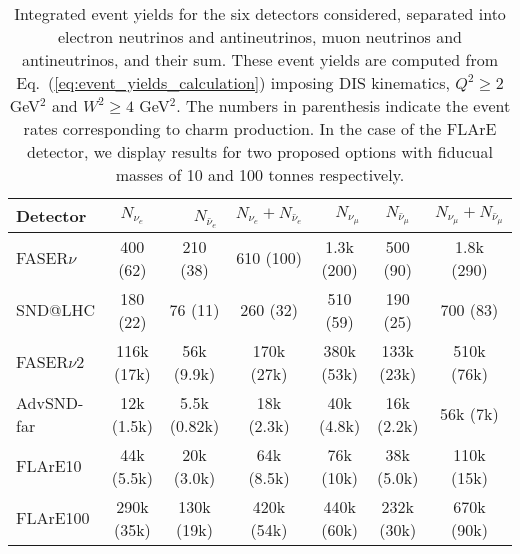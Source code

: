 \begin{table}[t]
  \centering
  \small
  \renewcommand{\arraystretch}{1.70}
\begin{tabularx}{\textwidth}{X||c|c|c||c|c|c}
\toprule
Detector & $\quad$ $N_{\nu_e}$ $\quad$ &$\quad$ $N_{\bar{\nu}_e}$$\quad$   &   $N_{\nu_e} + N_{\bar{\nu}_e}$ &
$\quad$$N_{\nu_\mu}$ $\quad$ & $\quad$ $N_{\bar{\nu}_\mu}$ $\quad$  &   $N_{\nu_\mu} + N_{\bar{\nu}_\mu}$ \\
\midrule
\midrule
FASER$\nu$  & 400 (62)    & 210 (38)  & 610 (100)  &  1.3k (200)  &  500 (90)  &  1.8k (290) \\
SND@LHC  &  180 (22)  & 76 (11)    & 260 (32)   &  510 (59) & 190 (25)   &  700  (83)\\
\midrule
\midrule
FASER$\nu$2  & 116k (17k)   & 56k (9.9k)   & 170k (27k)  & 380k (53k)  & 133k (23k)    & 510k (76k)   \\
AdvSND-far  &  12k (1.5k)  & 5.5k (0.82k)   & 18k (2.3k)  & 40k (4.8k)  & 16k (2.2k)   & 56k (7k)   \\
FLArE10 & 44k (5.5k) & 20k (3.0k)   &  64k (8.5k) &  76k (10k)&   38k (5.0k) &   110k (15k) \\
FLArE100 &   290k (35k)         &    130k (19k)         &       420k (54k)       &   440k (60k)      &  232k (30k)    &  670k (90k)  \\
  \bottomrule
\end{tabularx}
\vspace{0.2cm}
\caption{\small Integrated event yields for the six detectors considered,
  separated into electron neutrinos and antineutrinos,
  muon neutrinos and antineutrinos, and their sum.
  These event yields are computed from Eq.~(\ref{eq:event_yields_calculation})
  imposing DIS kinematics, $Q^2 \ge 2$ GeV$^2$ and $W^2 \ge 4$ GeV$^2$.
 The numbers in parenthesis indicate the event rates corresponding to charm
 production.
 In the case of the FLArE detector, we display results for two proposed
 options with fiducual masses of 10 and 100 tonnes respectively.
  \label{tab:integrated_rates}
}
\end{table}
